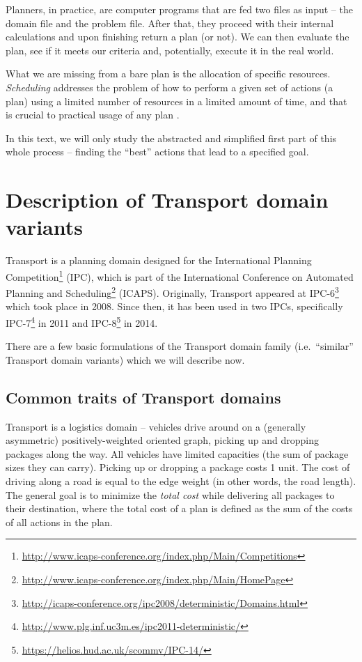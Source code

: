 Planners, in practice, are computer programs that are fed two files as input
-- the domain file and the problem file. After that, they proceed with their internal calculations
and upon finishing return a plan (or not). 
We can then evaluate the plan, see if it meets our criteria and, potentially,
execute it in the real world.

What we are missing from a bare plan is the allocation of specific resources.
\textit{Scheduling} addresses the problem of how to perform a given set of actions (a plan)
using a limited number of resources in a limited amount of time, and
that is crucial to practical usage of any plan \citep[Chapter~15]{Ghallab2004}.

In this text, we will only study the abstracted and simplified first part of this whole process
-- finding the ``best'' actions that lead to a specified goal.








\section{Description of Transport domain variants}

Transport is a planning domain designed for
the International Planning
Competition\footnote{\url{http://www.icaps-conference.org/index.php/Main/Competitions}}
(IPC), which is part of the International Conference on Automated Planning and
Scheduling\footnote{\url{http://www.icaps-conference.org/index.php/Main/HomePage}} (ICAPS).
Originally, Transport appeared at 
IPC-6\footnote{\url{http://icaps-conference.org/ipc2008/deterministic/Domains.html}} which took place in 2008.
Since then, it has been used in two IPCs,
specifically IPC-7\footnote{\url{http://www.plg.inf.uc3m.es/ipc2011-deterministic/}} in 2011
and IPC-8\footnote{\url{https://helios.hud.ac.uk/scommv/IPC-14/}} in 2014.

There are a few basic formulations of the Transport domain family (i.e.~``similar'' Transport domain variants) which we will describe now.

\subsection{Common traits of Transport domains}

Transport is a logistics domain -- vehicles drive around on a (generally asymmetric) positively-weighted oriented graph, picking up and dropping packages along the way.
All vehicles have limited capacities (the sum of package sizes they can carry).
Picking up or dropping a package costs 1 unit. The cost of driving along a road is equal to the edge weight
(in other words, the road length).
The general goal is to minimize the \textit{total cost}
while delivering all packages to their destination, where
the total cost of a plan is defined as the sum of the costs of all actions in
the plan.

